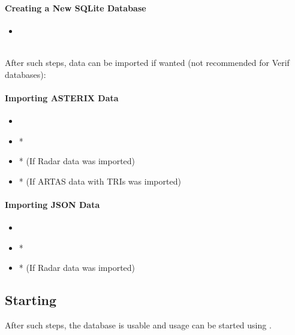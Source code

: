 \paragraph{Creating a New SQLite Database}

\begin{itemize}
 \item {}
\end{itemize}
\ \\

After such steps, data can be imported if wanted (not recommended for Verif databases):

\paragraph{Importing ASTERIX Data} 

\begin{itemize}
 \item {}
 \item {}*
 \item {}* (If Radar data was imported)
 \item {}* (If ARTAS data with TRIs was imported)
\end{itemize}

\paragraph{Importing JSON Data} 

\begin{itemize}
 \item {}
 \item {}*
 \item {}* (If Radar data was imported)
\end{itemize}

\subsection{Starting}
After such steps, the database is usable and usage can be started using .
